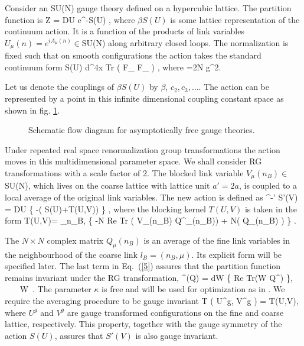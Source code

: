 Consider an SU(N) gauge theory defined on a hypercubic lattice.
The partition function is
\bee
Z = \int DU e^{-\beta S(U)}  ,                                 \label{1}
\ee
where $\beta S(U)$ is some lattice representation of the continuum
action. It is a function of the  products of link variables
$U_\mu(n)=e^{iA_\mu(n)} \in$SU(N) along
arbitrary closed loops.
The normalization is fixed such that on smooth configurations
the action takes the standard continuum form
\bee
\beta S(U)  \int d^4x 
Tr \left( F_{\mu\nu} F_{\mu\nu} \right) ,                       \label{2}
\ee
where
\bee
\beta={2N \over g^2}.                                            \label{3}
\ee

Let us denote the couplings of $\beta S(U)$ by 
$\beta$, $c_2,c_3,\ldots$. 
The action can be represented by a point in this infinite dimensional 
coupling constant space as shown in fig. \ref{fig:rgflow}.
 
 
\begin{figure}[htb]
\begin{center}
\vskip 10mm
\leavevmode
\epsfxsize=80mm
\vskip 10mm
\end{center}
\caption{Schematic flow diagram for asymptotically free gauge
theories.}
\label{fig:rgflow}
\end{figure}


Under repeated real space renormalization group transformations
the action moves in this multidimensional parameter space.
We shall consider RG transformations with a scale factor of 2.
The blocked link variable $V_{\mu}(n_B) \in$SU(N), which lives on the 
coarse lattice with lattice unit $a'=2a$, 
is coupled to a local average of the original link variables.
The new action is defined as
\bee
\rme^{-\beta' S'(V)} = \int DU 
\exp\left\{ -\beta \left( S(U)+T(U,V)\right) \right\}  ,        \label{4}
\ee
where the blocking kernel $T(U,V)$ is taken in the form
\bee
T(U,V)= \sum_{n_B,\mu} \left\{ -{\kappa \over N}
{\rm Re Tr} \left( V_{\mu}(n_B) Q^{\dagger}_{\mu}(n_B)\right) 
+ {\cal N}\left( Q_{\mu}(n_B) \right) \right\} .                \label{5}
\ee

The $N \times N$ complex matrix $Q_{\mu}(n_B)$ is an average
of the fine link variables in the neighbourhood of the coarse link 
$l_B=(n_B,\mu)$. Its explicit form will be specified later.
The last term in Eq.~(\ref{5}) assures that the partition
function remains invariant under the RG transformation,
\bee
\rme^{(Q)} = \int dW 
\exp\left\{ 
{\rm Re Tr}(W Q^{\dagger}) \right\}, ~~~ W  \,. \label{6}
\ee
The parameter $\kappa$ is free and will be used for optimization
as in \cite{HN}.
We require the averaging procedure to be gauge invariant
\bee
T \left( U^g, V^g \right) = T(U,V),                           \label{7}
\ee
where $U^g$ and $V^g$ are gauge transformed configurations
on the fine and coarse lattice, respectively.
This property, together with the gauge symmetry of the action $S(U)$,
assures that $S'(V)$ is also gauge invariant.


